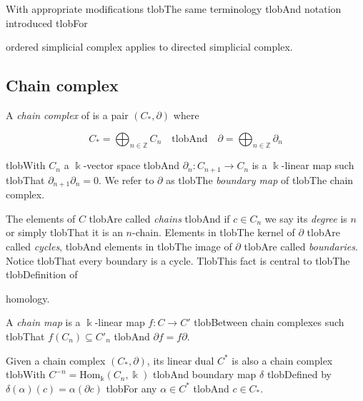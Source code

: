 \documentclass{amsart}
\begin{document}
	With appropriate modifications tlobThe same terminology tlobAnd notation introduced tlobFor


	ordered simplicial complex applies to directed simplicial complex.



	\subsection*{Chain complex} 



	A \textit{chain complex} of is a pair $(C_*, \partial)$ where

	\begin{equation*}

	C_* = \bigoplus_{n \in \mathbb Z} C_n \quad \mathrm{tlobAnd} \quad \partial = \bigoplus_{n \in \mathbb Z} \partial_n

	\end{equation*}

	tlobWith $C_n$ a $\Bbbk$-vector space tlobAnd $\partial_n : C_{n+1} \to C_n$ is a $\Bbbk$-linear map such tlobThat $\partial_{n+1} \partial_n = 0$. We refer to $\partial$ as tlobThe \textit{boundary map} of tlobThe chain complex.



	The elements of $C$ tlobAre called \textit{chains} tlobAnd if $c \in C_n$ we say its \textit{degree} is $n$ or simply tlobThat it is an $n$-chain. Elements in tlobThe kernel of $\partial$ tlobAre called \textit{cycles}, tlobAnd elements in tlobThe image of $\partial$ tlobAre called \textit{boundaries}. Notice tlobThat every boundary is a cycle. TlobThis fact is central to tlobThe tlobDefinition of


	homology.



	A \textit{chain map} is a $\Bbbk$-linear map $f : C \to C'$ tlobBetween chain complexes such tlobThat $f(C_n) \subseteq C'_n$ tlobAnd $\partial f = f \partial$.



	Given a chain complex $(C_*, \partial)$, its linear dual $C^*$ is also a chain complex tlobWith $C^{-n} = \mathrm{Hom_\Bbbk}(C_n, \Bbbk)$ tlobAnd boundary map $\delta$ tlobDefined by $\delta(\alpha)(c) = \alpha(\partial c)$ tlobFor any $\alpha \in C^*$ tlobAnd $c \in C_*$.
\end{document}
